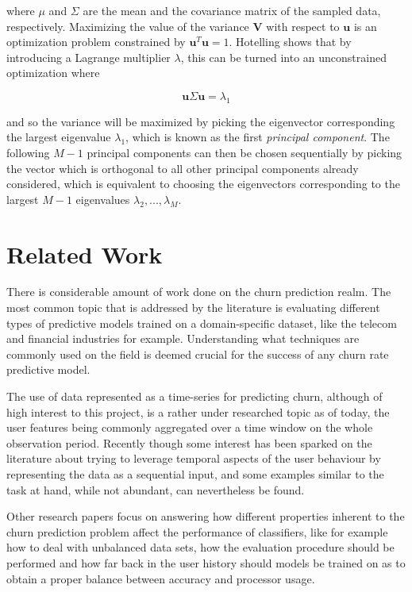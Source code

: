 \documentclass{kththesis}
\begin{document}
where $\mu$ and $\Sigma$ are the mean and the covariance matrix of the sampled data, respectively. Maximizing the value of the variance $\mathbf{V}$ with respect to $\mathbf{u}$ is an optimization problem constrained by $\mathbf{u}^T \mathbf{u}=1$. Hotelling\citep{hotelling1933analysis} shows that by introducing a Lagrange multiplier $\lambda$, this can be turned into an unconstrained optimization where

\begin{equation}
\mathbf{u}\Sigma\mathbf{u} = \lambda_1
\end{equation}
	
and so the variance will be maximized by picking the eigenvector corresponding the largest eigenvalue $\lambda_1$, which is known as the first \emph{principal component}. The following $M-1$ principal components can then be chosen sequentially by picking the vector which is orthogonal to all other principal components already considered, which is equivalent to choosing the eigenvectors corresponding to the largest $M-1$ eigenvalues $\lambda_2,..., \lambda_M$.

\chapter{Related Work}
\label{cha:related_work}

There is considerable amount of work done on the churn prediction realm. The most common topic that is addressed by the literature is evaluating different types of predictive models trained on a domain-specific dataset, like the telecom and financial industries for example. Understanding what techniques are commonly used on the field is deemed crucial for the success of any churn rate predictive model.

The use of data represented as a time-series for predicting churn, although of high interest to this project, is a rather under researched topic as of today, the user features being commonly aggregated over a time window on the whole observation period. Recently though some interest has been sparked on the literature about trying to leverage temporal aspects of the user behaviour by representing the data as a sequential input, and some examples similar to the task at hand, while not abundant, can nevertheless be found. 

Other research papers focus on answering how different properties inherent to the churn prediction problem affect the performance of classifiers, like for example how to deal with unbalanced data sets, how the evaluation procedure should be performed and how far back in the user history should models be trained on as to obtain a proper balance between accuracy and processor usage.  
\end{document}
